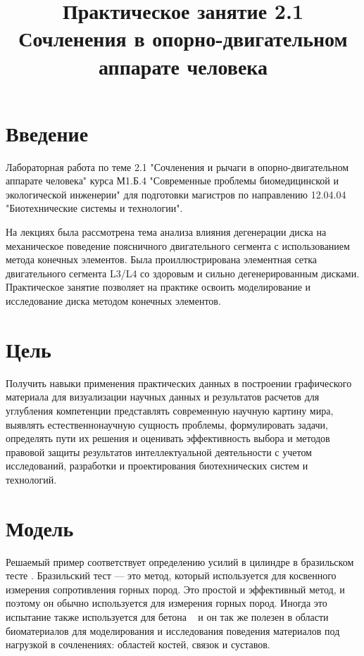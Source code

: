 \documentclass[11pt]{article}
\title{Практическое занятие 2.1 Сочленения в опорно-двигательном аппарате человека}
\begin{document}
    
    \maketitle
    
\tableofcontents{}
    
\section{Введение}
Лабораторная работа по теме 2.1 "Сочленения и рычаги в опорно-двигательном аппарате человека" курса М1.Б.4 "Современные проблемы биомедицинской и экологической инженерии" для подготовки магистров по направлению 12.04.04 "Биотехнические системы и технологии".

На лекциях была рассмотрена тема анализа влияния дегенерации диска на механическое поведение поясничного двигательного сегмента с использованием метода конечных элементов. Была проиллюстрирована элементная сетка двигательного сегмента L3/L4 со здоровым и сильно дегенерированным дисками.
Практическое занятие позволяет на практике освоить моделирование и исследование диска методом конечных элементов. 


\section{Цель}
Получить навыки применения практических данных в построении графического материала для визуализации научных данных и результатов расчетов для углубления компетенции представлять современную научную картину мира, выявлять естественнонаучную сущность проблемы, формулировать задачи, определять пути их решения и оценивать эффективность выбора и методов правовой защиты результатов интеллектуальной деятельности с учетом исследований, разработки и проектирования биотехнических систем и технологий.

\section{Модель}
Решаемый пример соответствует определению усилий в цилиндре в бразильском тесте . Бразильский тест — это метод, который используется для косвенного измерения сопротивления горных пород. Это простой и эффективный метод, и поэтому он обычно используется для измерения горных пород. Иногда это испытание также используется для бетона ~\cite{D3967-16} и он так же полезен в области биоматериалов для моделирования и исследования поведения материалов под нагрузкой в сочленениях: областей костей, связок и суставов.  
\end{document}
